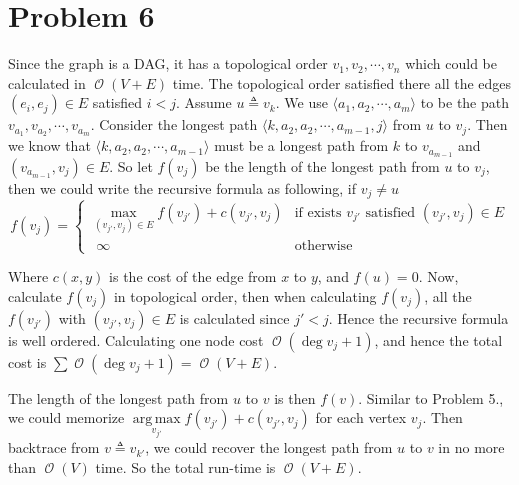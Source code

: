 \documentclass[12pt, a4paper]{article}
\DeclareMathOperator*{\argmax}{arg\,max}
\newcommand{\opord}{\operatorname{\mathcal{O}}}
\newcommand{\ord}[1]{\opord\left(#1\right)}
\begin{document}
\section{Problem 6}
Since the graph is a DAG, it has a topological order $v_1, v_2, \cdots, v_n$ 
which could be calculated in $\ord{V+E}$ time. The topological order satisfied 
there all the edges $(e_i, e_j) \in E$ satisfied $i < j$. Assume $u \triangleq v_k$.
We use $\langle a_1, a_2, \cdots, a_m \rangle$ to be the path
$v_{a_1}, v_{a_2}, \cdots, v_{a_m}$. Consider the longest path 
$\langle k, a_2, a_2, \cdots, a_{m-1}, j \rangle$ from $u$ to $v_j$. Then we know that
$\langle k, a_2, a_2, \cdots, a_{m-1} \rangle$ must be a longest path from $k$ to $v_{a_{m-1}}$
and $(v_{a_{m-1}}, v_j) \in E$. So let $f(v_j)$ be the length of the longest path from $u$ to $v_j$,
then we could write the recursive formula as following, if $v_j \neq u$
\[
  f(v_j) = 
\begin{cases}
  \max\limits_{(v_{j'}, v_j) \in E} f(v_{j'}) + c(v_{j'}, v_j)  & \text{if exists } v_{j'} \text{ satisfied } 
  (v_{j'}, v_j) \in E \\
  \ \ \infty & \text{otherwise}
\end{cases}
\]

Where $c(x, y)$ is the cost of the edge from $x$ to $y$, and $f(u) = 0$.
Now, calculate $f(v_j)$ in topological order, then when calculating $f(v_j)$,
all the $f(v_{j'})$ with $(v_{j'}, v_j) \in E$ is calculated since $j' < j$.
Hence the recursive formula is well ordered. Calculating one node cost $\ord{\deg v_j + 1}$,
and hence the total cost is $\sum \ord{\deg v_j + 1} = \ord{V + E}$.

The length of the longest path from $u$ to $v$ is then $f(v)$.
Similar to Problem 5., we could memorize $\argmax\limits_{v_{j'}} f(v_{j'}) + c(v_{j'}, v_j)$ for
each vertex $v_j$. Then backtrace from $v \triangleq v_{k'}$, we could recover the longest
path from $u$ to $v$ in no more than $\ord{V}$ time. So the total run-time is $\ord{V + E}$.
\end{document}
